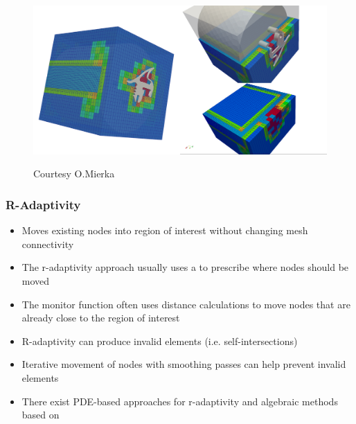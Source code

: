 \begin{frame}
\begin{figure}[h!]
\centering
\includegraphics[width=1.\textwidth]{screenshots/GEO_BIW.png}
\label{fig:domains}
\caption{Courtesy O.Mierka}
\end{figure}
\end{frame}

\begin{frame}
\frametitle{R-Adaptivity}
\begin{itemize}
\item Moves existing nodes into region of interest without changing mesh connectivity
\item The r-adaptivity approach usually uses a  to prescribe where nodes should be moved
\item The monitor function often uses distance calculations to move nodes that are already close to the region of interest
\item R-adaptivity can produce invalid elements (i.e. self-intersections) 
\item Iterative movement of nodes with smoothing passes can help prevent invalid elements
\item There exist PDE-based approaches \cite{GrajewskiKoesterTurek2008b} for r-adaptivity and algebraic methods based on  \cite{Muenster:2016}
\end{itemize}
\end{frame}

